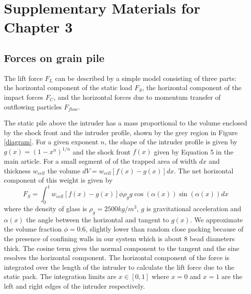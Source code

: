 \chapter{Supplementary Materials for Chapter 3}
\author{Mohammad Y Karim, Eric I. Corwin}


\section{Forces on grain pile}
The lift force $F_{L}$ can be described by a simple model consisting of three parts: the horizontal component of the static load $F_{S}$, the horizontal component of the impact forces $F_{C}$, and the horizontal forces due to momentum transfer of outflowing particles $F_{flow}$.  

The static pile above the intruder has a mass proportional to the volume enclosed by the shock front and the intruder profile, shown by the grey region in Figure \ref{diagram}. For a given exponent $n$, the shape of the intruder profile is given by $g(x)=(1-x^n)^{1/n}$ and the shock front $f(x)$ given by Equation 5 in the main article. For a small segment of of the trapped area of width $dx$ and thickness $w_{cell}$ the volume $dV=w_{cell}[f(x)-g(x)]dx$. The net horizontal component of this weight is given by
\begin{equation} 
F_{S} = \int_0^1  w_{cell}  [f(x)-g(x)] \phi\rho_{g}g\cos(\alpha(x)) \sin(\alpha(x))dx
\label{fstatic}
\end{equation}
where the density of glass is $\rho_{g}=2500kg/m^3$, $g$ is gravitational acceleration and $\alpha(x)$ the angle between the horizontal and tangent to $g(x)$. We approximate the volume fraction $\phi=0.6$, slightly lower than random close packing because of the presence of confining walls in our system which is about 8 bead diameters thick. The cosine term gives the normal component to the tangent and the sine resolves the horizontal component. The horizontal component of the force is integrated over the length of the intruder to calculate the lift force due to the static pack. The integration limits are $x\in[0,1]$ where $x=0$ and $x=1$ are the left and right edges of the intruder respectively.

